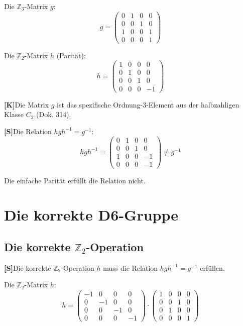 \documentclass[11pt,a4paper]{article}
\newcommand{\Kstatus}{\textbf{[K]}}
\newcommand{\Sstatus}{\textbf{[S]}}
\begin{document}
	Die $\mathbb{Z}_3$-Matrix $g$:
	\begin{equation}
		g = \begin{pmatrix}
			0 & 1 & 0 & 0 \\
			0 & 0 & 1 & 0 \\
			1 & 0 & 0 & 1 \\
			0 & 0 & 0 & 1
		\end{pmatrix}
	\end{equation}
	
	Die $\mathbb{Z}_2$-Matrix $h$ (Parität):
	\begin{equation}
		h = \begin{pmatrix}
			1 & 0 & 0 & 0 \\
			0 & 1 & 0 & 0 \\
			0 & 0 & 1 & 0 \\
			0 & 0 & 0 & -1
		\end{pmatrix}
	\end{equation}
	
	\Kstatus Die Matrix $g$ ist das spezifische Ordnung-3-Element aus der halbzahligen Klasse $C_2$ (Dok. 314).
	
	\Sstatus Die Relation $h g h^{-1} = g^{-1}$:
	\begin{equation}
		h g h^{-1} = \begin{pmatrix}
			0 & 1 & 0 & 0 \\
			0 & 0 & 1 & 0 \\
			1 & 0 & 0 & -1 \\
			0 & 0 & 0 & -1
		\end{pmatrix} \neq g^{-1}
	\end{equation}
	
	Die einfache Parität erfüllt die Relation nicht.
	
	\section{Die korrekte D6-Gruppe}
	
	\subsection{Die korrekte $\mathbb{Z}_2$-Operation}
	
	\Sstatus Die korrekte $\mathbb{Z}_2$-Operation $h$ muss die Relation $h g h^{-1} = g^{-1}$ erfüllen.
	
	Die $\mathbb{Z}_2$-Matrix $h$:
	\begin{equation}
		h = \begin{pmatrix}
			-1 & 0 & 0 & 0 \\
			0 & -1 & 0 & 0 \\
			0 & 0 & -1 & 0 \\
			0 & 0 & 0 & -1
		\end{pmatrix} \cdot \begin{pmatrix}
			1 & 0 & 0 & 0 \\
			0 & 0 & 1 & 0 \\
			0 & 1 & 0 & 0 \\
			0 & 0 & 0 & 1
		\end{pmatrix}
	\end{equation}
	
\end{document}
